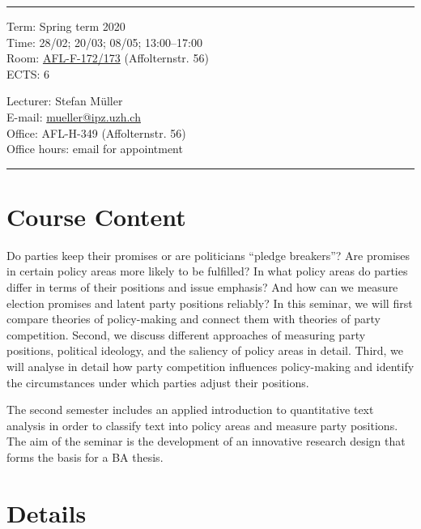 \documentclass[abstract=on,parskip=full,headings=standardclasses,fontsize=11pt,paper=a4]{scrartcl}
\begin{document}
\hrule
\medskip
\begin{minipage}[t]{0.5\textwidth}
Term: Spring term 2020 \\
Time: 28/02; 20/03; 08/05; 13:00--17:00 \\
Room:  \href{https://www.plaene.uzh.ch/AFL}{AFL-F-172/173} (Affolternstr. 56) \\
ECTS: 6
\end{minipage}
\begin{minipage}[t]{0.49\textwidth}
\begin{flushright}
Lecturer: Stefan Müller \\
E-mail: \href{mailto:mueller@ipz.uzh.ch}{\textsf{mueller@ipz.uzh.ch}} \\
Office:  AFL-H-349 (Affolternstr. 56) \\
Office hours: email for appointment \\
\end{flushright}
\end{minipage}
\medskip
\vspace{2.5mm}
\hrule 
 

\section*{Course Content}

Do parties keep their promises or are politicians ``pledge breakers''? Are promises in certain policy areas more likely to be fulfilled? In what policy areas do parties differ in terms of their positions and issue emphasis? And how can we measure election promises and latent party positions reliably? In this seminar, we will first compare theories of policy-making and connect them with theories of party competition. Second, we discuss different approaches of measuring party positions, political ideology, and the saliency of policy areas in detail. Third, we will analyse in detail how party competition influences policy-making and identify the circumstances under which parties adjust their positions.

The second semester includes an applied introduction to quantitative text analysis in order to classify text into policy areas and measure party positions. The aim of the seminar is the development of an innovative research design that forms the basis for a BA thesis.


\section*{Details}
\end{document}
